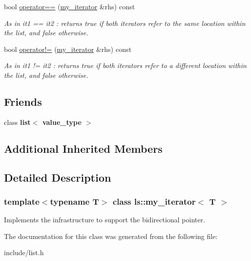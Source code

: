 \begin{DoxyCompactItemize}
\mbox{\label{classls_1_1my__iterator_a7582cc03e5885a77599f509dd06bb0cf}} 
bool \hyperlink{classls_1_1my__iterator_a7582cc03e5885a77599f509dd06bb0cf}{operator==} (\hyperlink{classls_1_1my__iterator}{my\+\_\+iterator} \&rhs) const
\begin{DoxyCompactList}\small\item\em As in it1 == it2 \+: returns true if both iterators refer to the same location within the list, and false otherwise. \end{DoxyCompactList}\item 
\mbox{\label{classls_1_1my__iterator_a57a517f86159fc752b74b06a73fdfa68}} 
bool \hyperlink{classls_1_1my__iterator_a57a517f86159fc752b74b06a73fdfa68}{operator!=} (\hyperlink{classls_1_1my__iterator}{my\+\_\+iterator} \&rhs) const
\begin{DoxyCompactList}\small\item\em As in it1 != it2 \+: returns true if both iterators refer to a different location within the list, and false otherwise. \end{DoxyCompactList}\end{DoxyCompactItemize}
\subsection*{Friends}
\begin{DoxyCompactItemize}
\item 
\mbox{\label{classls_1_1my__iterator_aa4cf6f043abfca0b41eb074c92dac6fa}} 
class {\bfseries list$<$ value\+\_\+type $>$}
\end{DoxyCompactItemize}
\subsection*{Additional Inherited Members}


\subsection{Detailed Description}
\subsubsection*{template$<$typename T$>$\newline
class ls\+::my\+\_\+iterator$<$ T $>$}

Implements the infrastructure to support the bidirectional pointer. 

The documentation for this class was generated from the following file\+:\begin{DoxyCompactItemize}
\item 
include/list.\+h\end{DoxyCompactItemize}
